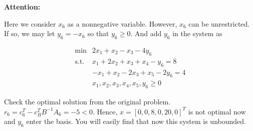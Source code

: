 \documentclass[12pt]{article}
\begin{document}
\textbf{Attention:}

Here we consider $x_6$ as a nonnegative variable. However, $x_6$ can be unrestricted. If so, we may let $y_6 = -x_6$ so that $y_6 \geqslant 0$. And add $y_6$ in the system as

\begin{equation*}
  \begin{array}{rl}
    \min & 2x_1+x_2-x_3 -4y_6 \\
    \text{s.t.} & x_1+2x_2+x_3 + x_4 -y_6 = 8 \\
    & -x_1 + x_2 - 2x_3 + x_5 -2y_6= 4 \\
    & x_1,x_2,x_3,x_4,x_5,y_6 \geq 0
  \end{array}
  \end{equation*}
  
Check the optimal solution from the original problem. $r_6 = c_6^T - c_B^TB^{-1}A_6 = -5 <0$. Hence, $x = [0,0,8,0,20,0]^T$ is not optimal now and $y_6$ enter the basis. You will easily find that now this system is unbounded. 
\end{document}
